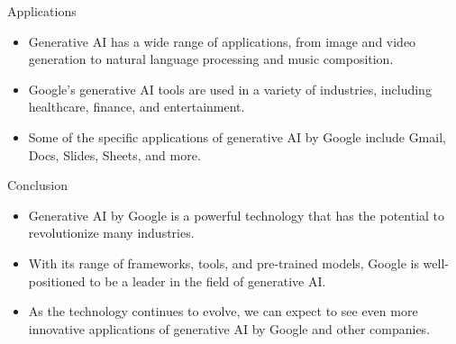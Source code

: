 \begin{frame}[fragile]{Applications}
\begin{itemize}
\item Generative AI has a wide range of applications, from image and video generation to natural language processing and music composition.
\item Google's generative AI tools are used in a variety of industries, including healthcare, finance, and entertainment.
\item Some of the specific applications of generative AI by Google include Gmail, Docs, Slides, Sheets, and more.
\end{itemize}
\end{frame}

\begin{frame}[fragile]{Conclusion}
\begin{itemize}
\item Generative AI by Google is a powerful technology that has the potential to revolutionize many industries.
\item With its range of frameworks, tools, and pre-trained models, Google is well-positioned to be a leader in the field of generative AI.
\item As the technology continues to evolve, we can expect to see even more innovative applications of generative AI by Google and other companies.
\end{itemize}
\end{frame}